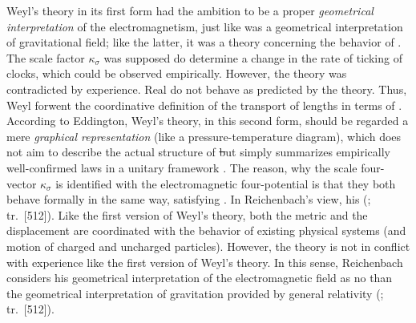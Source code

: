 \documentclass[final]{article}
\renewcommand{\rzlp}[2]{(\cite[#1]{Reichenbach1928}; tr.\ #2)\xspace}
\renewcommand{\rzlap}[2]{(\cite[#1]{Reichenbach1928}; tr.\ [#2])\xspace}
\begin{document}
Weyl's theory in its first form had the ambition to be a proper \emph{geometrical interpretation} of the electromagnetism, just like \gr was a geometrical interpretation of gravitational field; like the latter, it was a theory concerning the behavior of \rac. The scale factor $\kappa_\sigma$ was supposed do determine a change in the rate of ticking of clocks, which could be observed empirically. However, the theory was contradicted by experience. Real \rac do not behave as predicted by the theory. Thus, Weyl forwent the coordinative definition of the transport of lengths in terms of \rac. According to Eddington, Weyl's theory, in this second form, should be regarded a mere \emph{graphical representation} (like a pressure-temperature diagram), which does not aim to describe the actual structure of \st but simply summarizes empirically well-confirmed laws in a unitary framework \citep[see][\S8.3]{Ryckman2005}. The reason, why the scale four-vector $\kappa_\sigma$ is identified with the electromagnetic four-potential is that they both behave formally in the same way, satisfying . In Reichenbach's view, his  \rzlap{365}{512}. Like the first version of Weyl's theory, both the metric and the displacement are coordinated with the behavior of existing physical systems (\rac and motion of charged and uncharged particles). However, the theory is not in conflict with experience like the first version of Weyl's theory. In this sense, Reichenbach considers his geometrical interpretation of the electromagnetic field as no  than the geometrical interpretation of gravitation provided by general relativity \rzlap{366}{512}.

\end{document}
